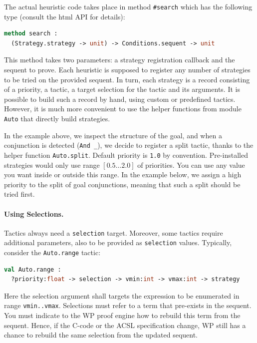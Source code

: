 The actual heuristic code takes place in method \lstinline$#search$ which has the following type (consult the html API for details):
\begin{lstlisting}[language=ocaml]
method search :
  (Strategy.strategy -> unit) -> Conditions.sequent -> unit
\end{lstlisting}

This method takes two parameters: a strategy registration callback and the sequent to prove. Each heuristic
is supposed to register any number of strategies to be tried on the provided sequent. In turn, each strategy
is a record consisting of a priority, a tactic, a target selection for the tactic and its arguments.
It is possible to build such a record by hand, using custom or predefined tactics. However, it is much more convenient
to use the helper functions from module \lstinline$Auto$ that directly build strategies.

In the example above, we inspect the structure of the goal, and when a conjunction is detected (\lstinline$And _$),
we decide to register a split tactic, thanks to the helper function \lstinline$Auto.split$. Default priority is \lstinline$1.0$ by convention. Pre-installed strategies would only use range $[0.5\ldots2.0]$ of priorities. You can use any value you want inside or outside this range. In the example below, we assign a high priority to the split of goal conjunctions, meaning that such a split should be tried first.

\paragraph{Using Selections.} Tactics always need a \lstinline$selection$ target. Moreover, some tactics require additional parameters, also to be provided as \lstinline$selection$ values. Typically, consider the \lstinline$Auto.range$ tactic:

\begin{lstlisting}[language=ocaml]
val Auto.range :
  ?priority:float -> selection -> vmin:int -> vmax:int -> strategy
\end{lstlisting}

Here the selection argument shall targets the expression to be enumerated in range \lstinline$vmin..vmax$.
Selections must refer to a term that pre-exists in the sequent. You must indicate to the \textsf{WP} proof engine
how to rebuild this term from the sequent. Hence, if the \textsf{C}-code or the \textsf{ACSL} specification change,
\textsf{WP} still has a chance to rebuild the same selection from the updated sequent.

